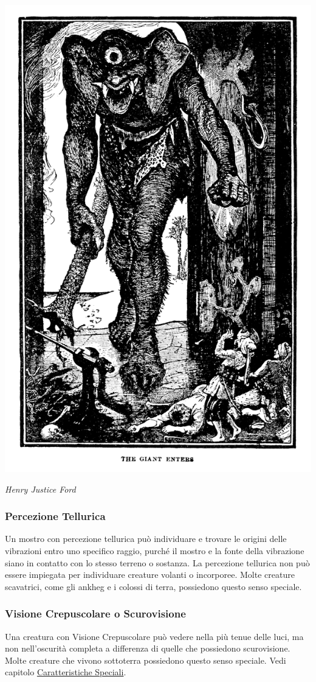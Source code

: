 \begin{multicols}{2}
\begin{center}
	\includegraphics[width=0.7\linewidth]{immagini/ciclope.png}

	\emph{Henry Justice Ford}
\end{center}

\subsubsection{Percezione Tellurica}

Un mostro con percezione tellurica può individuare e trovare le origini delle vibrazioni entro uno specifico raggio, purché il mostro e la fonte della vibrazione siano in contatto con lo stesso terreno o sostanza. La percezione tellurica non può essere impiegata per individuare creature volanti o incorporee. Molte creature scavatrici, come gli ankheg e i colossi di terra, possiedono questo senso speciale.

\subsubsection{Visione Crepuscolare o Scurovisione}

Una creatura con Visione Crepuscolare può vedere nella più tenue delle luci, ma non nell'oscurità completa a differenza di quelle che possiedono scurovisione. Molte creature che vivono sottoterra possiedono questo senso speciale. Vedi capitolo \hyperlink{visioneeluce}{Caratteristiche Speciali}.


\end{multicols}
